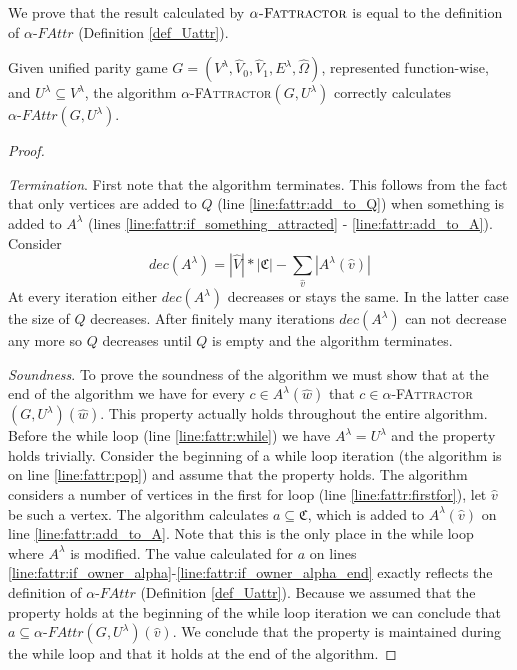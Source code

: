 We prove that the result calculated by $\alpha\textsc{-Fattractor}$ is equal to the definition of $\alpha\textit{-FAttr}$ (Definition \ref{def_Uattr}). 

\begin{theorem}
Given unified parity game $G = (V^\lambda, \hat{V}_0,\hat{V}_1,E^\lambda,\hat{\Omega})$, represented function-wise, and $U^\lambda \subseteq V^\lambda$, the algorithm $\alpha$-\textsc{FAttractor}$(G, U^\lambda)$ correctly calculates $\alpha\textit{-FAttr}(G,U^\lambda)$.
	\begin{proof}\ 
		
		\textit{Termination}. First note that the algorithm terminates. This follows from the fact that only vertices are added to $Q$ (line \ref{line:fattr:add_to_Q}) when something is added to $A^\lambda$ (lines \ref{line:fattr:if_something_attracted} - \ref{line:fattr:add_to_A}). Consider
		\[ \textit{dec}(A^\lambda) = |\hat{V}|*|\mathfrak{C}| - \sum_{\hat{v}}|A^\lambda(\hat{v})| \]
		At every iteration either $\textit{dec}(A^\lambda)$ decreases or stays the same. In the latter case the size of $Q$ decreases. After finitely many iterations $\textit{dec}(A^\lambda)$ can not decrease any more so $Q$ decreases until $Q$ is empty and the algorithm terminates.
		
		\textit{Soundness}. To prove the soundness of the algorithm we must show that at the end of the algorithm we have for every $c\in A^\lambda(\hat{w})$ that $c \in \alpha$-\textsc{FAttractor}$(G, U^\lambda)(\hat{w})$. This property actually holds throughout the entire algorithm. Before the while loop (line \ref{line:fattr:while}) we have $A^\lambda = U^\lambda$ and the property holds trivially. Consider the beginning of a while loop iteration (the algorithm is on line \ref{line:fattr:pop}) and assume that the property holds. The algorithm considers a number of vertices in the first for loop (line \ref{line:fattr:firstfor}), let $\hat{v}$ be such a vertex. The algorithm calculates $a \subseteq \mathfrak{C}$, which is added to $A^\lambda(\hat{v})$ on line \ref{line:fattr:add_to_A}. Note that this is the only place in the while loop where $A^\lambda$ is modified. The value calculated for $a$ on lines \ref{line:fattr:if_owner_alpha}-\ref{line:fattr:if_owner_alpha_end} exactly reflects the definition of $\alpha\textit{-FAttr}$ (Definition \ref{def_Uattr}). Because we assumed that the property holds at the beginning of the while loop iteration we can conclude that $a \subseteq \alpha\textit{-FAttr}(G,U^\lambda)(\hat{v})$. We conclude that the property is maintained during the while loop and that it holds at the end of the algorithm.
		

\end{proof}
\end{theorem}
